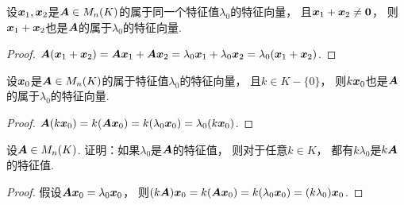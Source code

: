 \begin{proposition}\label{theorem:矩阵的特征值与特征向量.特征子空间1}
设\(\boldsymbol{x}_1,\boldsymbol{x}_2\)是\(\boldsymbol{A} \in M_n(K)\)的属于同一个特征值\(\lambda_0\)的特征向量，
且\(\boldsymbol{x}_1 + \boldsymbol{x}_2 \neq \boldsymbol0\)，
则\(\boldsymbol{x}_1 + \boldsymbol{x}_2\)也是\(\boldsymbol{A}\)的属于\(\lambda_0\)的特征向量.
\begin{proof}
\(\boldsymbol{A} (\boldsymbol{x}_1 + \boldsymbol{x}_2)
= \boldsymbol{A} \boldsymbol{x}_1 + \boldsymbol{A} \boldsymbol{x}_2
= \lambda_0 \boldsymbol{x}_1 + \lambda_0 \boldsymbol{x}_2
= \lambda_0 (\boldsymbol{x}_1 + \boldsymbol{x}_2)\).
\end{proof}
\end{proposition}
\begin{proposition}\label{theorem:矩阵的特征值与特征向量.特征子空间2}
设\(\boldsymbol{x}_0\)是\(\boldsymbol{A} \in M_n(K)\)的属于特征值\(\lambda_0\)的特征向量，
且\(k \in K-\{0\}\)，
则\(k \boldsymbol{x}_0\)也是\(\boldsymbol{A}\)的属于\(\lambda_0\)的特征向量.
\begin{proof}
\(\boldsymbol{A} (k \boldsymbol{x}_0)
= k (\boldsymbol{A} \boldsymbol{x}_0)
= k (\lambda_0 \boldsymbol{x}_0)
= \lambda_0 (k \boldsymbol{x}_0)\).
\end{proof}
\end{proposition}
\begin{example}\label{example:矩阵的特征值与特征向量.矩阵的多项式的特征值1}
设\(\boldsymbol{A} \in M_n(K)\).
证明：如果\(\lambda_0\)是\(\boldsymbol{A}\)的特征值，
则对于任意\(k \in K\)，
都有\(k\lambda_0\)是\(k\boldsymbol{A}\)的特征值.
\begin{proof}
假设\(\boldsymbol{A} \boldsymbol{x}_0 = \lambda_0 \boldsymbol{x}_0\)，
则\((k\boldsymbol{A}) \boldsymbol{x}_0
= k(\boldsymbol{A} \boldsymbol{x}_0)
= k(\lambda_0 \boldsymbol{x}_0)
= (k\lambda_0) \boldsymbol{x}_0\).
\end{proof}
\end{example}
